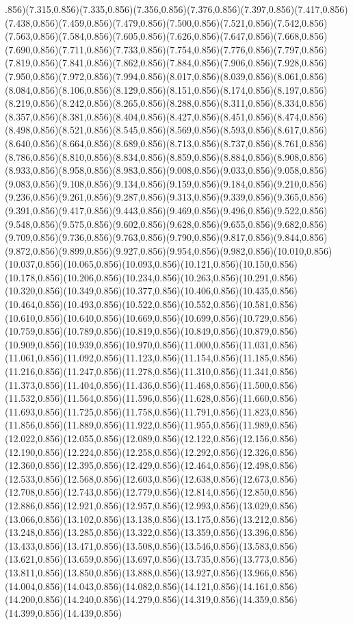 \documentclass[smallextended]{svjour3}
\begin{document}
.856)(7.315,0.856)(7.335,0.856)(7.356,0.856)(7.376,0.856)(7.397,0.856)(7.417,0.856)(7.438,0.856)(7.459,0.856)(7.479,0.856)(7.500,0.856)(7.521,0.856)(7.542,0.856)(7.563,0.856)(7.584,0.856)(7.605,0.856)(7.626,0.856)(7.647,0.856)(7.668,0.856)(7.690,0.856)(7.711,0.856)(7.733,0.856)(7.754,0.856)(7.776,0.856)(7.797,0.856)(7.819,0.856)(7.841,0.856)(7.862,0.856)(7.884,0.856)(7.906,0.856)(7.928,0.856)(7.950,0.856)(7.972,0.856)(7.994,0.856)(8.017,0.856)(8.039,0.856)(8.061,0.856)(8.084,0.856)(8.106,0.856)(8.129,0.856)(8.151,0.856)(8.174,0.856)(8.197,0.856)(8.219,0.856)(8.242,0.856)(8.265,0.856)(8.288,0.856)(8.311,0.856)(8.334,0.856)(8.357,0.856)(8.381,0.856)(8.404,0.856)(8.427,0.856)(8.451,0.856)(8.474,0.856)(8.498,0.856)(8.521,0.856)(8.545,0.856)(8.569,0.856)(8.593,0.856)(8.617,0.856)(8.640,0.856)(8.664,0.856)(8.689,0.856)(8.713,0.856)(8.737,0.856)(8.761,0.856)(8.786,0.856)(8.810,0.856)(8.834,0.856)(8.859,0.856)(8.884,0.856)(8.908,0.856)(8.933,0.856)(8.958,0.856)(8.983,0.856)(9.008,0.856)(9.033,0.856)(9.058,0.856)(9.083,0.856)(9.108,0.856)(9.134,0.856)(9.159,0.856)(9.184,0.856)(9.210,0.856)(9.236,0.856)(9.261,0.856)(9.287,0.856)(9.313,0.856)(9.339,0.856)(9.365,0.856)(9.391,0.856)(9.417,0.856)(9.443,0.856)(9.469,0.856)(9.496,0.856)(9.522,0.856)(9.548,0.856)(9.575,0.856)(9.602,0.856)(9.628,0.856)(9.655,0.856)(9.682,0.856)(9.709,0.856)(9.736,0.856)(9.763,0.856)(9.790,0.856)(9.817,0.856)(9.844,0.856)(9.872,0.856)(9.899,0.856)(9.927,0.856)(9.954,0.856)(9.982,0.856)(10.010,0.856)(10.037,0.856)(10.065,0.856)(10.093,0.856)(10.121,0.856)(10.150,0.856)(10.178,0.856)(10.206,0.856)(10.234,0.856)(10.263,0.856)(10.291,0.856)(10.320,0.856)(10.349,0.856)(10.377,0.856)(10.406,0.856)(10.435,0.856)(10.464,0.856)(10.493,0.856)(10.522,0.856)(10.552,0.856)(10.581,0.856)(10.610,0.856)(10.640,0.856)(10.669,0.856)(10.699,0.856)(10.729,0.856)(10.759,0.856)(10.789,0.856)(10.819,0.856)(10.849,0.856)(10.879,0.856)(10.909,0.856)(10.939,0.856)(10.970,0.856)(11.000,0.856)(11.031,0.856)(11.061,0.856)(11.092,0.856)(11.123,0.856)(11.154,0.856)(11.185,0.856)(11.216,0.856)(11.247,0.856)(11.278,0.856)(11.310,0.856)(11.341,0.856)(11.373,0.856)(11.404,0.856)(11.436,0.856)(11.468,0.856)(11.500,0.856)(11.532,0.856)(11.564,0.856)(11.596,0.856)(11.628,0.856)(11.660,0.856)(11.693,0.856)(11.725,0.856)(11.758,0.856)(11.791,0.856)(11.823,0.856)(11.856,0.856)(11.889,0.856)(11.922,0.856)(11.955,0.856)(11.989,0.856)(12.022,0.856)(12.055,0.856)(12.089,0.856)(12.122,0.856)(12.156,0.856)(12.190,0.856)(12.224,0.856)(12.258,0.856)(12.292,0.856)(12.326,0.856)(12.360,0.856)(12.395,0.856)(12.429,0.856)(12.464,0.856)(12.498,0.856)(12.533,0.856)(12.568,0.856)(12.603,0.856)(12.638,0.856)(12.673,0.856)(12.708,0.856)(12.743,0.856)(12.779,0.856)(12.814,0.856)(12.850,0.856)(12.886,0.856)(12.921,0.856)(12.957,0.856)(12.993,0.856)(13.029,0.856)(13.066,0.856)(13.102,0.856)(13.138,0.856)(13.175,0.856)(13.212,0.856)(13.248,0.856)(13.285,0.856)(13.322,0.856)(13.359,0.856)(13.396,0.856)(13.433,0.856)(13.471,0.856)(13.508,0.856)(13.546,0.856)(13.583,0.856)(13.621,0.856)(13.659,0.856)(13.697,0.856)(13.735,0.856)(13.773,0.856)(13.811,0.856)(13.850,0.856)(13.888,0.856)(13.927,0.856)(13.966,0.856)(14.004,0.856)(14.043,0.856)(14.082,0.856)(14.121,0.856)(14.161,0.856)(14.200,0.856)(14.240,0.856)(14.279,0.856)(14.319,0.856)(14.359,0.856)(14.399,0.856)(14.439,0.856)
\end{document}
